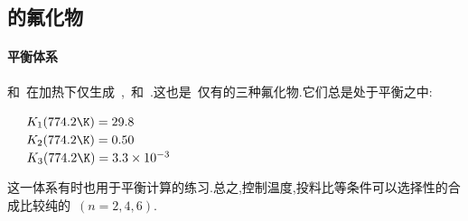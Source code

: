 \documentclass{ctexbook}
\begin{document}
\subsection{的氟化物}
\paragraph{平衡体系}
和~在加热下仅生成~,~和~.这也是~仅有的三种氟化物.它们总是处于平衡之中:
\begin{tightcenter}
    \ \ \ $K_1(774.2\K)=29.8$\\
    \ \ \ $K_2(774.2\K)=0.50$\\
    \ \ \ $K_3(774.2\K)=3.3\times10^{-3}$
\end{tightcenter}
这一体系有时也用于平衡计算的练习.总之,控制温度,投料比等条件可以选择性的合成比较纯的~$(n=2,4,6)$.
\end{document}
